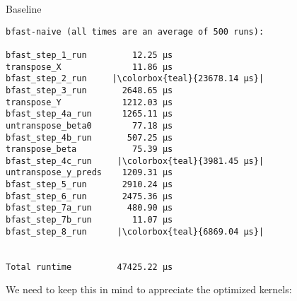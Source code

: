 \begin{frame}[fragile]{Baseline}
%
    \centering
    \begin{verbatim}
bfast-naive (all times are an average of 500 runs):

bfast_step_1_run         12.25 µs
transpose_X              11.86 µs
bfast_step_2_run     |\colorbox{teal}{23678.14 µs}|
bfast_step_3_run       2648.65 µs
transpose_Y            1212.03 µs
bfast_step_4a_run      1265.11 µs
untranspose_beta0        77.18 µs
bfast_step_4b_run       507.25 µs
transpose_beta           75.39 µs
bfast_step_4c_run     |\colorbox{teal}{3981.45 µs}|
untranspose_y_preds    1209.31 µs
bfast_step_5_run       2910.24 µs
bfast_step_6_run       2475.36 µs
bfast_step_7a_run       480.90 µs
bfast_step_7b_run        11.07 µs
bfast_step_8_run      |\colorbox{teal}{6869.04 µs}|


Total runtime         47425.22 µs
\end{verbatim}

\pause

We need to keep this in mind to appreciate the optimized kernels:

\end{frame}

